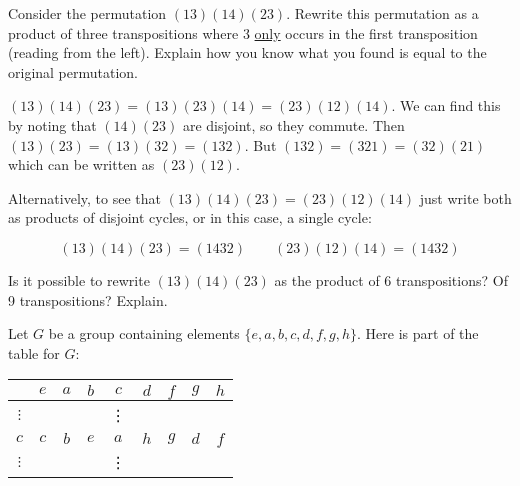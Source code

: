 \documentclass[11pt]{exam}
\begin{document}
\begin{questions}



\question[8] Consider the permutation $(13)(14)(23)$.  Rewrite this permutation as a product of three transpositions where 3 \underline{only} occurs in the first transposition (reading from the left).  Explain how you know what you found is equal to the original permutation.
\begin{solution}
 $(13)(14)(23) = (13)(23)(14) = (23)(12)(14)$.  We can find this by noting that $(14)(23)$ are disjoint, so they commute.  Then $(13)(23) = (13)(32) = (132)$.  But $(132) = (321) = (32)(21)$ which can be written as $(23)(12)$.  
 
 Alternatively, to see that $(13)(14)(23) = (23)(12)(14)$ just write both as products of disjoint cycles, or in this case, a single cycle:
 
 \[(13)(14)(23) = (1432) \qquad (23)(12)(14) = (1432)\]
\end{solution}
\vfill
\question[6] Is it possible to rewrite $(13)(14)(23)$ as the product of 6 transpositions?  Of 9 transpositions? Explain.
\vfill

\clearpage

\question[12] Let $G$ be a group containing elements $\{e, a, b, c, d, f, g, h\}$.  Here is part of the table for $G$:
\begin{center}
  \begin{tabular}{c|cccccccc}
         & $e$ & $a$ & $b$ & $c$ & $d$ & $f$ & $g$ & $h$ \\ \hline
     $\vdots$ & &&& \vdots & & & & \\
     $c$ & $c$ & $b$ & $e$ & $a$ & $h$ & $g$ & $d$ & $f$ \\ 
     $\vdots$ & &&& \vdots & & & & 
   \end{tabular}
\end{center}
\end{questions}
\end{document}
